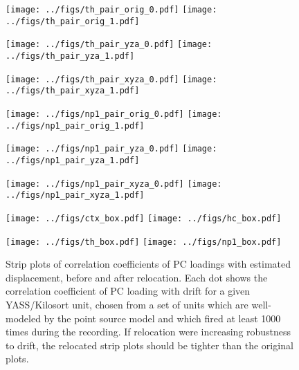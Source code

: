 \documentclass[
  12pt,
]{article}
\theoremstyle{plain}
\theoremstyle{definition}
\theoremstyle{remark}
\newcommand{\1}[1]{\mathbb{1}_{{#1}}}
\begin{document}
\begin{figure}[hbtp]
\begin{adjustwidth*}{-1.6in}{-1.6in}
\begin{center}
\texttt{[image: ../figs/th\_pair\_orig\_0.pdf]}
\texttt{[image: ../figs/th\_pair\_orig\_1.pdf]}

\medskip

\texttt{[image: ../figs/th\_pair\_yza\_0.pdf]}
\texttt{[image: ../figs/th\_pair\_yza\_1.pdf]}

\medskip

\texttt{[image: ../figs/th\_pair\_xyza\_0.pdf]}
\texttt{[image: ../figs/th\_pair\_xyza\_1.pdf]}
\end{center}
\end{adjustwidth*}
\end{figure}

\begin{figure}[hbtp]
\begin{adjustwidth*}{-1.6in}{-1.6in}
\begin{center}
\texttt{[image: ../figs/np1\_pair\_orig\_0.pdf]}
\texttt{[image: ../figs/np1\_pair\_orig\_1.pdf]}

\medskip

\texttt{[image: ../figs/np1\_pair\_yza\_0.pdf]}
\texttt{[image: ../figs/np1\_pair\_yza\_1.pdf]}

\medskip

\texttt{[image: ../figs/np1\_pair\_xyza\_0.pdf]}
\texttt{[image: ../figs/np1\_pair\_xyza\_1.pdf]}
\end{center}
\end{adjustwidth*}
\end{figure}

\FloatBarrier

\begin{figure}[hbtp]
\begin{adjustwidth*}{-1.6in}{-1.6in}
\begin{center}
\texttt{[image: ../figs/ctx\_box.pdf]}
\texttt{[image: ../figs/hc\_box.pdf]}

\texttt{[image: ../figs/th\_box.pdf]}
\texttt{[image: ../figs/np1\_box.pdf]}
\end{center}
\end{adjustwidth*}
\caption{Strip plots of correlation coefficients of PC loadings with estimated displacement, before and after relocation. Each dot shows the correlation coefficient of PC loading with drift for a given YASS/Kilosort unit, chosen from a set of units which are well-modeled by the point source model and which fired at least 1000 times during the recording. If relocation were increasing robustness to drift, the relocated strip plots should be tighter than the original plots.}
\label{fig:strips}
\end{figure}
\end{document}
